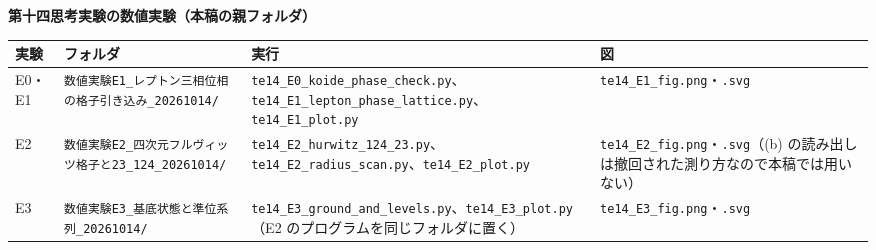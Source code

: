 \documentclass[
  a4paper,
]{ltjsarticle}
\newcounter{none} %
\begin{document}
\textbf{第十四思考実験の数値実験（本稿の親フォルダ）}

{\def\LTcaptype{none} %
\begin{longtable}[]{@{}
  >{\raggedright\arraybackslash}p{}
  >{\raggedright\arraybackslash}p{}
  >{\raggedright\arraybackslash}p{}
  >{\raggedright\arraybackslash}p{}@{}}
\toprule\noalign{}
\begin{minipage}[b]{\linewidth}\raggedright
実験
\end{minipage} & \begin{minipage}[b]{\linewidth}\raggedright
フォルダ
\end{minipage} & \begin{minipage}[b]{\linewidth}\raggedright
実行
\end{minipage} & \begin{minipage}[b]{\linewidth}\raggedright
図
\end{minipage} \\
\midrule\noalign{}
\endhead
\bottomrule\noalign{}
\endlastfoot
E0・E1 & \texttt{数値実験E1\_\allowbreak{}レプトン三相位相の格子引き込み\_\allowbreak{}20261014/\allowbreak{}}
&
\texttt{te14\_\allowbreak{}E0\_\allowbreak{}koide\_\allowbreak{}phase\_\allowbreak{}check.py}、\texttt{te14\_\allowbreak{}E1\_\allowbreak{}lepton\_\allowbreak{}phase\_\allowbreak{}lattice.py}、\texttt{te14\_\allowbreak{}E1\_\allowbreak{}plot.py}
& \texttt{te14\_\allowbreak{}E1\_\allowbreak{}fig.png}・\texttt{.svg} \\
E2 & \texttt{数値実験E2\_\allowbreak{}四次元フルヴィッツ格子と23\_\allowbreak{}124\_\allowbreak{}20261014/\allowbreak{}} &
\texttt{te14\_\allowbreak{}E2\_\allowbreak{}hurwitz\_\allowbreak{}124\_\allowbreak{}23.py}、\texttt{te14\_\allowbreak{}E2\_\allowbreak{}radius\_\allowbreak{}scan.py}、\texttt{te14\_\allowbreak{}E2\_\allowbreak{}plot.py}
& \texttt{te14\_\allowbreak{}E2\_\allowbreak{}fig.png}・\texttt{.svg}（(b)
の読み出しは撤回された測り方なので本稿では用いない） \\
E3 & \texttt{数値実験E3\_\allowbreak{}基底状態と準位系列\_\allowbreak{}20261014/\allowbreak{}} &
\texttt{te14\_\allowbreak{}E3\_\allowbreak{}ground\_\allowbreak{}and\_\allowbreak{}levels.py}、\texttt{te14\_\allowbreak{}E3\_\allowbreak{}plot.py}（E2
のプログラムを同じフォルダに置く） &
\texttt{te14\_\allowbreak{}E3\_\allowbreak{}fig.png}・\texttt{.svg} \\

\end{longtable}}
\end{document}
